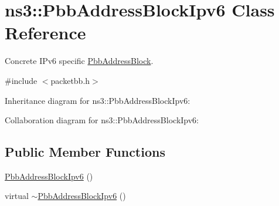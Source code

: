\hypertarget{classns3_1_1PbbAddressBlockIpv6}{}\section{ns3\+:\+:Pbb\+Address\+Block\+Ipv6 Class Reference}
\label{classns3_1_1PbbAddressBlockIpv6}


Concrete I\+Pv6 specific \hyperlink{classns3_1_1PbbAddressBlock}{Pbb\+Address\+Block}.  




{\ttfamily \#include $<$packetbb.\+h$>$}



Inheritance diagram for ns3\+:\+:Pbb\+Address\+Block\+Ipv6\+:


Collaboration diagram for ns3\+:\+:Pbb\+Address\+Block\+Ipv6\+:
\subsection*{Public Member Functions}
\begin{DoxyCompactItemize}
\item 
\hyperlink{classns3_1_1PbbAddressBlockIpv6_ab7fd9dc027e325c886df60934be49edc}{Pbb\+Address\+Block\+Ipv6} ()
\item 
virtual \hyperlink{classns3_1_1PbbAddressBlockIpv6_a5d3453462d8d71f7d6052836483769a1}{$\sim$\+Pbb\+Address\+Block\+Ipv6} ()
\end{DoxyCompactItemize}
